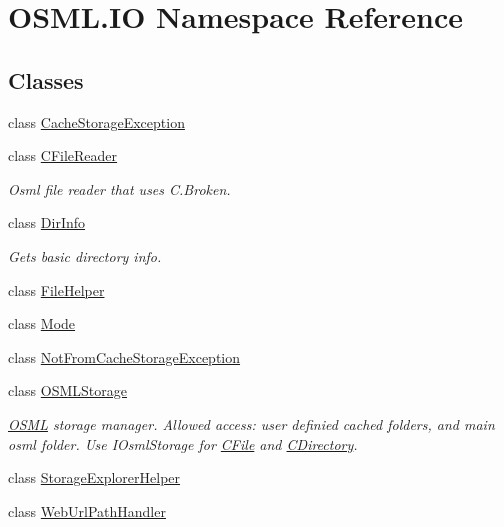 \hypertarget{namespaceOSML_1_1IO}{}\section{O\+S\+M\+L.\+IO Namespace Reference}
\label{namespaceOSML_1_1IO}
\subsection*{Classes}
\begin{DoxyCompactItemize}
\item 
class \mbox{\hyperlink{classOSML_1_1IO_1_1CacheStorageException}{Cache\+Storage\+Exception}}
\item 
class \mbox{\hyperlink{classOSML_1_1IO_1_1CFileReader}{C\+File\+Reader}}
\begin{DoxyCompactList}\small\item\em Osml file reader that uses C.\+Broken. \end{DoxyCompactList}\item 
class \mbox{\hyperlink{classOSML_1_1IO_1_1DirInfo}{Dir\+Info}}
\begin{DoxyCompactList}\small\item\em Gets basic directory info. \end{DoxyCompactList}\item 
class \mbox{\hyperlink{classOSML_1_1IO_1_1FileHelper}{File\+Helper}}
\item 
class \mbox{\hyperlink{classOSML_1_1IO_1_1Mode}{Mode}}
\item 
class \mbox{\hyperlink{classOSML_1_1IO_1_1NotFromCacheStorageException}{Not\+From\+Cache\+Storage\+Exception}}
\item 
class \mbox{\hyperlink{classOSML_1_1IO_1_1OSMLStorage}{O\+S\+M\+L\+Storage}}
\begin{DoxyCompactList}\small\item\em \mbox{\hyperlink{namespaceOSML}{O\+S\+ML}} storage manager. Allowed access\+: user definied cached folders, and main osml folder. Use I\+Osml\+Storage for \mbox{\hyperlink{classOSML_1_1IO_1_1OSMLStorage_1_1CFile}{C\+File}} and \mbox{\hyperlink{classOSML_1_1IO_1_1OSMLStorage_1_1CDirectory}{C\+Directory}}. \end{DoxyCompactList}\item 
class \mbox{\hyperlink{classOSML_1_1IO_1_1StorageExplorerHelper}{Storage\+Explorer\+Helper}}
\item 
class \mbox{\hyperlink{classOSML_1_1IO_1_1WebUrlPathHandler}{Web\+Url\+Path\+Handler}}
\end{DoxyCompactItemize}
